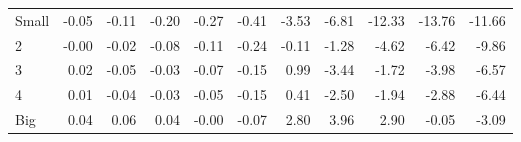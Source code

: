 \begin{table}[!ht]
\begin{tabular}{lrrrrrrrrrr}
    \\
      \cmidrule(r){2-6} \cmidrule(r){7-11}

    Small   & -0.05  & -0.11  & -0.20  & -0.27  & -0.41  & -3.53  & -6.81  & -12.33  & -13.76  & -11.66  \\
         2  & -0.00  & -0.02  & -0.08  & -0.11  & -0.24  & -0.11  & -1.28  & -4.62  & -6.42  & -9.86  \\
         3  & 0.02  & -0.05  & -0.03  & -0.07  & -0.15  & 0.99  & -3.44  & -1.72  & -3.98  & -6.57  \\
         4  & 0.01  & -0.04  & -0.03  & -0.05  & -0.15  & 0.41  & -2.50  & -1.94  & -2.88  & -6.44  \\
    Big     & 0.04  & 0.06  & 0.04  & -0.00  & -0.07  & 2.80  & 3.96  & 2.90  & -0.05  & -3.09  \\

  

  \bottomrule
\end{tabular}
\label{tbl:25_Size_Var_C97}
\end{table}